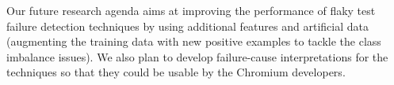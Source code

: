 
 Our future research agenda aims at improving the performance of flaky test failure detection techniques by using additional features and artificial data (augmenting the training data with new positive examples to tackle the class imbalance issues). We also plan to develop failure-cause interpretations for the techniques so that they could be usable by the Chromium developers.  